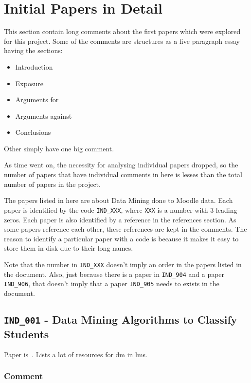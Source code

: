 \section{Initial Papers in Detail}

This section contain long comments about the first papers which were explored
for this project. Some of the comments are structures as a five paragraph essay
having the sections:

\begin{itemize}
    \item Introduction
    \item Exposure
    \item Arguments for
    \item Arguments against
    \item Conclusions
\end{itemize}

Other simply have one big comment.

As time went on, the necessity for analysing individual papers dropped, so the
number of papers that have individual comments in here is lesses than the total
number of papers in the project.

The papers listed in here are about Data Mining done to Moodle data. Each paper
is identified by the code \texttt{IND\_XXX}, where \texttt{XXX} is a number
with 3 leading zeros. Each paper is also identified by a reference in the
references section. As some papers reference each other, these references are
kept in the comments. The reason to identify a particular paper with a code is
because it makes it easy to store them in disk due to their long names.

Note that the number in \texttt{IND\_XXX} doesn't imply an order in the papers
listed in the document. Also, just because there is a paper in
\texttt{IND\_904} and a paper \texttt{IND\_906}, that doesn't imply that a
paper \texttt{IND\_905} needs to exists in the document.

\subsection{\texttt{IND\_001} - Data Mining Algorithms to Classify Students}

Paper is~\cite{ind_001}. Lists a lot of resources for \gls{dm} in \gls{lms}.

\subsubsection{Comment}

